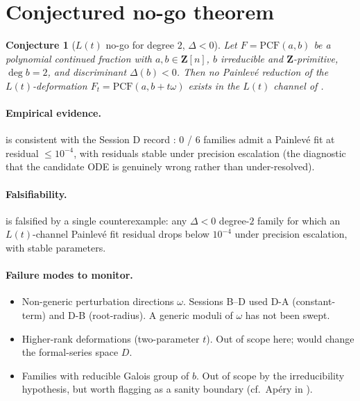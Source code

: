\documentclass[11pt,reqno]{amsart}
\theoremstyle{plain}
\newtheorem{conjecture}[theorem]{Conjecture}
\theoremstyle{definition}
\theoremstyle{remark}
\newcommand{\PCF}{\mathrm{PCF}}
\newcommand{\Lt}{L(t)}
\begin{document}
\section{Conjectured no-go theorem}
\label{sec:nogo}

\begin{conjecture}[$\Lt$ no-go for degree $2$, $\Delta<0$]
\label{conj:nogo}
Let $F = \PCF(a, b)$ be a polynomial continued fraction with
$a, b \in \mathbf{Z}[n]$, $b$ irreducible and
$\mathbf{Z}$-primitive, $\deg b = 2$, and discriminant
$\Delta(b) < 0$. Then no Painlev\'e reduction of the
$\Lt$-deformation
$F_t = \PCF(a, b + t\omega)$ exists in the
$\Lt$ channel of .
\end{conjecture}

\paragraph{Empirical evidence.}  is consistent
with the Session D record \cite{siarc_painleve_deep_6x}:
0 / 6 families admit a Painlev\'e fit at residual
$\le 10^{-4}$, with residuals stable under precision
escalation (the diagnostic that the candidate ODE is genuinely
wrong rather than under-resolved).

\paragraph{Falsifiability.}  is falsified by a
single counterexample: any $\Delta<0$ degree-$2$ family for
which an $\Lt$-channel Painlev\'e fit residual drops below
$10^{-4}$ under precision escalation, with stable
parameters.

\paragraph{Failure modes to monitor.}
\begin{itemize}
\item Non-generic perturbation directions $\omega$. Sessions
B--D used D-A (constant-term) and D-B (root-radius). A
generic moduli of $\omega$ has not been swept.
\item Higher-rank deformations (two-parameter $t$). Out of
scope here; would change the formal-series space $D$.
\item Families with reducible Galois group of $b$. Out of
scope by the irreducibility hypothesis, but worth flagging
as a sanity boundary (cf.\ Ap\'ery in
\cite{siarc_pcf2_program}).
\end{itemize}
\end{document}
